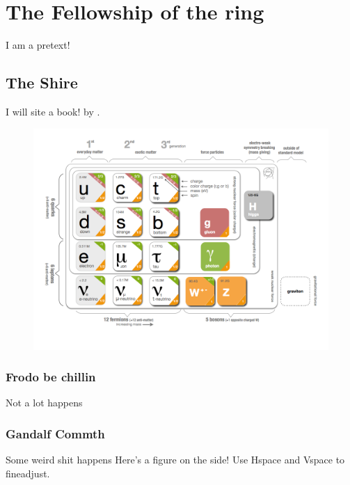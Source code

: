 \chapter{The Fellowship of the ring}
\label{ch:fellowship} %
\begin{tcolorbox}
  I am a pretext!
\end{tcolorbox}

\section{The Shire} \label{sec:shire}
I will site a book!
 by \citeauthor{srednicki:2006} \citep{srednicki:2006}.
\begin{figure}
  \includegraphics[width=1.15\linewidth]{Images/Part_1/SMinfographic_image.png}
\end{figure}

\subsection{Frodo be chillin} \label{sec:frodoNchill}
Not a lot happens

\subsection{Gandalf Commth} \label{sec:bitchImGandalf}
Some weird shit happens
Here's a figure on the side! Use Hspace and Vspace to fineadjust.


